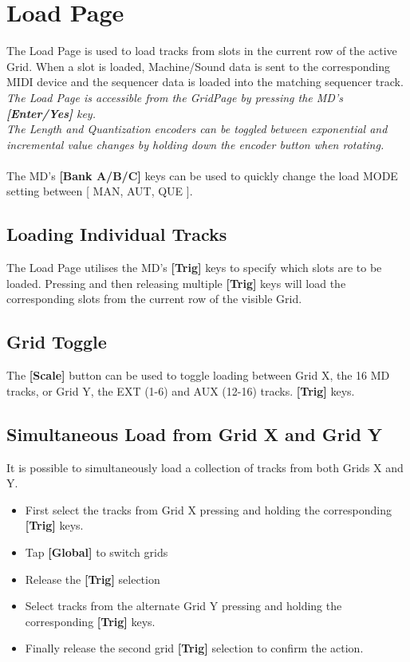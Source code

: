\chapter{Load Page}
The Load Page is used to load tracks from slots in the current row of the active Grid. When a slot is loaded, Machine/Sound data is sent to the corresponding MIDI device and the sequencer data is loaded into the matching sequencer track.
\\
\textit{The Load Page is accessible from the GridPage by pressing the MD's \textbf{[Enter/Yes]} key.}
\\
\textit{The Length and Quantization encoders can be toggled between exponential and incremental value changes by holding down the encoder button when rotating.}
\\\\
The MD's \textbf{[Bank A/B/C]} keys can be used to quickly change the load MODE setting between [ MAN, AUT, QUE ].
\newpage
\section{Loading Individual Tracks}
The Load Page utilises the MD's \textbf{[Trig]} keys to specify which slots are to be loaded. Pressing and then releasing multiple \textbf{[Trig]} keys will load the corresponding slots from the current row of the visible Grid.
\section{Grid Toggle}
The \textbf{[Scale]} button can be used to toggle loading between Grid X, the 16 MD tracks, or Grid Y, the EXT (1-6) and AUX (12-16) tracks.
\textbf{[Trig]} keys.
\section{Simultaneous Load from Grid X and Grid Y}
It is possible to simultaneously load a collection of tracks from both Grids X and Y. 
\begin{itemize}
\item First select the tracks from Grid X pressing and holding the corresponding \textbf{[Trig]} keys.
\item Tap \textbf{[Global]} to switch grids
\item Release the \textbf{[Trig]} selection
\item Select tracks from the alternate Grid Y pressing and holding the corresponding \textbf{[Trig]} keys. 
\item Finally release the second grid \textbf{[Trig]} selection to confirm the action. 
\end{itemize}

